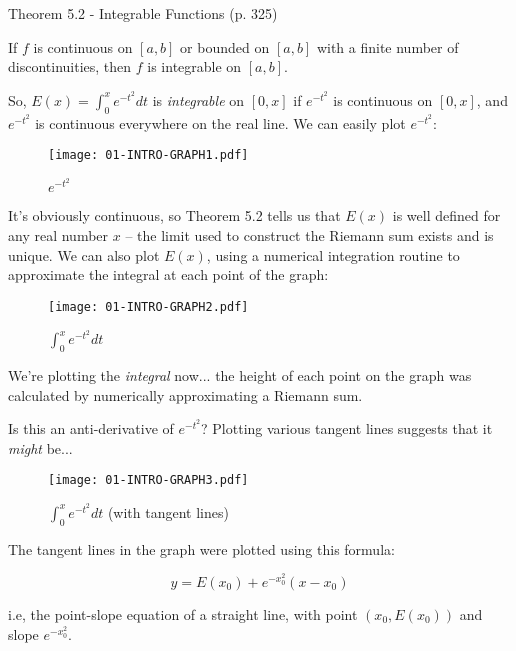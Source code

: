 \begin{framed}
Theorem 5.2 - Integrable Functions (p. 325)

If $f$ is continuous on $[a,b]$ or bounded on $[a,b]$ with a finite number of discontinuities,
then $f$ is integrable on $[a,b]$.
\end{framed}

So, $E(x) = \int_0^x e^{-t^2} dt$ is {\it integrable} on $[0,x]$ if $e^{-t^2}$ is continuous on $[0,x]$,
and $e^{-t^2}$ is continuous everywhere on the real line.  We can easily plot $e^{-t^2}$:

\begin{figure}[H]
\begin{center}
\texttt{[image: 01-INTRO-GRAPH1.pdf]}
\end{center}
\caption{$e^{-t^2}$}
\end{figure}

It's obviously continuous, so Theorem 5.2 tells us that $E(x)$ is well
defined for any real number $x$ -- the limit used to construct the
Riemann sum exists and is unique.  We can also plot $E(x)$, using a
numerical integration routine to approximate the integral at each
point of the graph:

\begin{figure}[H]
\begin{center}
\texttt{[image: 01-INTRO-GRAPH2.pdf]}
\end{center}
\caption{$\int_0^x e^{-t^2} dt$}
\end{figure}

We're plotting the {\it integral} now... the height of each point on the graph
was calculated by numerically approximating a Riemann sum.

Is this an anti-derivative of $e^{-t^2}$?  Plotting various tangent lines suggests
that it {\it might} be...

\begin{figure}[H]
\begin{center}
\texttt{[image: 01-INTRO-GRAPH3.pdf]}
\end{center}
\caption{$\int_0^x e^{-t^2} dt$ (with tangent lines)}
\end{figure}

The tangent lines in the graph were plotted using this formula:

$$ y = E(x_0) + e^{-x_0^2}(x-x_0)$$

i.e, the point-slope equation of a straight line, with point $(x_0, E(x_0))$ and slope $e^{-x_0^2}$.

